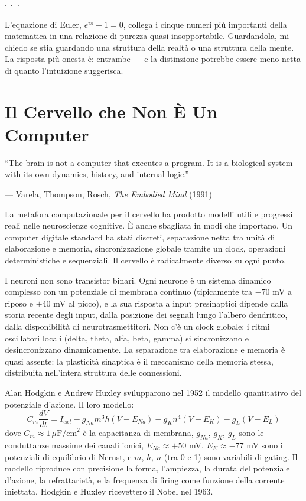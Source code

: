 \documentclass[12pt,a4paper,openany]{book}
\newcommand{\sezione}[1]{\vspace{1.2em}{\large\bfseries #1}\vspace{0.5em}\par}
\newcommand{\puntini}{\begin{center}$\cdot\ \cdot\ \cdot$\end{center}\vspace{0.3em}}
\begin{document}
\puntini

L'equazione di Euler, $e^{i\pi} + 1 = 0$, collega i cinque numeri più importanti della matematica in una relazione di purezza quasi insopportabile. Guardandola, mi chiedo se stia guardando una struttura della realtà o una struttura della mente. La risposta più onesta è: entrambe --- e la distinzione potrebbe essere meno netta di quanto l'intuizione suggerisca.

\chapter{Il Cervello che Non È Un Computer}

\epigraph{``The brain is not a computer that executes a program. It is a biological system with its own dynamics, history, and internal logic.''}{--- Varela, Thompson, Rosch, \textit{The Embodied Mind} (1991)}

\sezione{La metafora sbagliata nel posto giusto}

La metafora computazionale per il cervello ha prodotto modelli utili e progressi reali nelle neuroscienze cognitive. È anche sbagliata in modi che importano. Un computer digitale standard ha stati discreti, separazione netta tra unità di elaborazione e memoria, sincronizzazione globale tramite un clock, operazioni deterministiche e sequenziali. Il cervello è radicalmente diverso su ogni punto.

I neuroni non sono transistor binari. Ogni neurone è un sistema dinamico complesso con un potenziale di membrana continuo (tipicamente tra $-70$ mV a riposo e $+40$ mV al picco), e la sua risposta a input presinaptici dipende dalla storia recente degli input, dalla posizione dei segnali lungo l'albero dendritico, dalla disponibilità di neurotrasmettitori. Non c'è un clock globale: i ritmi oscillatori locali (delta, theta, alfa, beta, gamma) si sincronizzano e desincronizzano dinamicamente. La separazione tra elaborazione e memoria è quasi assente: la plasticità sinaptica è il meccanismo della memoria stessa, distribuita nell'intera struttura delle connessioni.

\sezione{Il modello di Hodgkin-Huxley}

Alan Hodgkin e Andrew Huxley svilupparono nel 1952 il modello quantitativo del potenziale d'azione. Il loro modello:
\[
C_m \frac{dV}{dt} = I_{ext} - g_{Na} m^3 h(V - E_{Na}) - g_K n^4(V - E_K) - g_L(V - E_L)
\]
dove $C_m \approx 1\,\mu\mathrm{F/cm}^2$ è la capacitanza di membrana, $g_{Na}$, $g_K$, $g_L$ sono le conduttanze massime dei canali ionici, $E_{Na} \approx +50$ mV, $E_K \approx -77$ mV sono i potenziali di equilibrio di Nernst, e $m$, $h$, $n$ (tra 0 e 1) sono variabili di gating. Il modello riproduce con precisione la forma, l'ampiezza, la durata del potenziale d'azione, la refrattarietà, e la frequenza di firing come funzione della corrente iniettata. Hodgkin e Huxley ricevettero il Nobel nel 1963.
\end{document}
